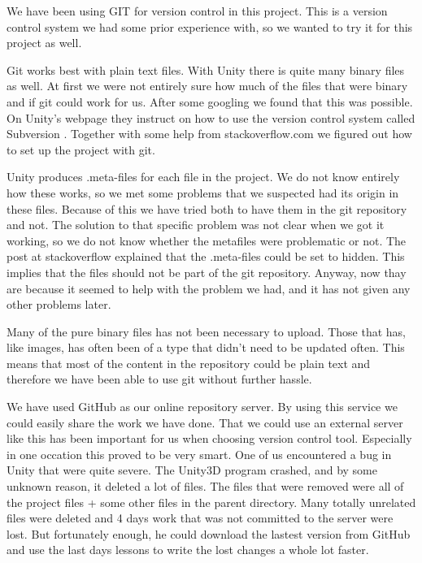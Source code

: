We have been using GIT for version control in this project. This is a version
control system we had some prior experience with, so we wanted to try it for 
this project as well. 

Git works best with plain text files. With Unity there is quite many binary
files as well. At first we were not entirely sure how much of the files that
were binary and if git could work for us. After some googling we found that 
this was possible. On Unity's webpage they instruct on how to use the version
control system called Subversion \cite{SubversionControl}. Together with some
help from stackoverflow.com\cite{gitVersionControl} we figured out how to set 
up the project with git.

Unity produces .meta-files for each file in the project. We do not know 
entirely how these works, so we met some problems that we suspected had its
origin in these files. Because of this we have tried both to have them in
the git repository and not. The solution to that specific problem was not
clear when we got it working, so we do not know whether the metafiles were
problematic or not. The post at stackoverflow explained that the .meta-files 
could be set to hidden. This implies that the files should not be part
of the git repository. Anyway, now thay are because it seemed to help with the
problem we had, and it has not given any other problems later.

Many of the pure binary files has not been necessary to upload. Those that
has, like images, has often been of a type that didn't need to be updated
often. This means that most of the content in the repository could be plain
text and therefore we have been able to use git without further hassle.

We have used GitHub \cite{GitHub} as our online repository server. By using
this service we could easily share the work we have done. That we could use
an external server like this has been important for us when choosing version
control tool. Especially in one occation this proved to be very smart. One of
us encountered a bug in Unity that were quite severe. The Unity3D program
crashed, and by some unknown reason, it deleted a lot of files. The files that
were removed were all of the project files + some other files in the parent
directory. Many totally unrelated files were deleted and 4 days work that was
not committed to the server were lost. But fortunately enough, he could
download the lastest version from GitHub and use the last days lessons to write
the lost changes a whole lot faster.


